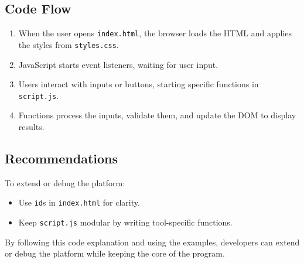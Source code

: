 \documentclass[11pt,twocolumn]{article}
\begin{document}
\subsection{Code Flow}
\begin{enumerate}
    \item When the user opens \texttt{index.html}, the browser loads the HTML and applies the styles from \texttt{styles.css}.
    \item JavaScript starts event listeners, waiting for user input.
    \item Users interact with inputs or buttons, starting specific functions in \texttt{script.js}.
    \item Functions process the inputs, validate them, and  update the DOM to display results.
\end{enumerate}

\subsection{Recommendations}
To extend or debug the platform:
\begin{itemize}
    \item Use \texttt{id}s in \texttt{index.html} for clarity.
    \item Keep \texttt{script.js} modular by writing tool-specific functions.
\end{itemize}

By following this code explanation and using the examples, developers can  extend or debug the platform while keeping the core of the program.
\end{document}
